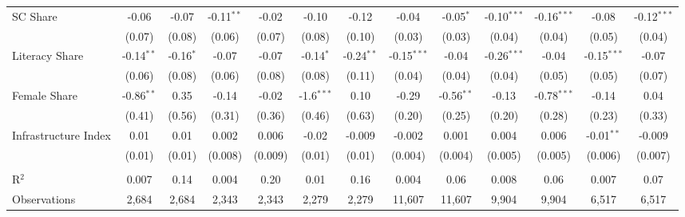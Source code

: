 \begin{adjustbox}{max width=\linewidth}
\begin{threeparttable}[b]
\begin{tabular}{lcccccccccccc}
         SC Share              & -0.06        & -0.07         & -0.11$^{**}$ & -0.02         & -0.10        & -0.12         & -0.04         & -0.05$^{*}$   & -0.10$^{***}$ & -0.16$^{***}$ & -0.08         & -0.12$^{***}$\\   
                               & (0.07)       & (0.08)        & (0.06)       & (0.07)        & (0.08)       & (0.10)        & (0.03)        & (0.03)        & (0.04)        & (0.04)        & (0.05)        & (0.04)\\   
         Literacy Share        & -0.14$^{**}$ & -0.16$^{*}$   & -0.07        & -0.07         & -0.14$^{*}$  & -0.24$^{**}$  & -0.15$^{***}$ & -0.04         & -0.26$^{***}$ & -0.04         & -0.15$^{***}$ & -0.07\\   
                               & (0.06)       & (0.08)        & (0.06)       & (0.08)        & (0.08)       & (0.11)        & (0.04)        & (0.04)        & (0.04)        & (0.05)        & (0.05)        & (0.07)\\   
         Female Share          & -0.86$^{**}$ & 0.35          & -0.14        & -0.02         & -1.6$^{***}$ & 0.10          & -0.29         & -0.56$^{**}$  & -0.13         & -0.78$^{***}$ & -0.14         & 0.04\\   
                               & (0.41)       & (0.56)        & (0.31)       & (0.36)        & (0.46)       & (0.63)        & (0.20)        & (0.25)        & (0.20)        & (0.28)        & (0.23)        & (0.33)\\   
         Infrastructure Index  & 0.01         & 0.01          & 0.002        & 0.006         & -0.02        & -0.009        & -0.002        & 0.001         & 0.004         & 0.006         & -0.01$^{**}$  & -0.009\\   
                               & (0.01)       & (0.01)        & (0.008)      & (0.009)       & (0.01)       & (0.01)        & (0.004)       & (0.004)       & (0.005)       & (0.005)       & (0.006)       & (0.007)\\   
          \\
         R$^2$                 & 0.007        & 0.14          & 0.004        & 0.20          & 0.01         & 0.16          & 0.004         & 0.06          & 0.008         & 0.06          & 0.007         & 0.07\\  
         Observations          & 2,684        & 2,684         & 2,343        & 2,343         & 2,279        & 2,279         & 11,607        & 11,607        & 9,904         & 9,904         & 6,517         & 6,517\\  

\end{tabular}
\end{threeparttable}
\end{adjustbox}
